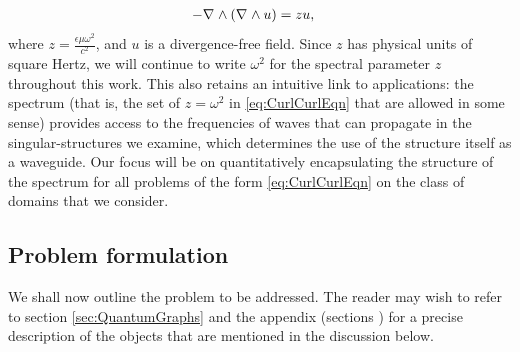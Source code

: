 \begin{align} \label{eq:CurlCurlEqn}
	- \nabla_{}\wedge\left(  \nabla_{}\wedge u  \right) &= zu,
\end{align}
where $z = \frac{\epsilon\mu\omega^2}{c^2}$, and $u$ is a divergence-free field.
Since $z$ has physical units of square Hertz, we will continue to write $\omega^2$ for the spectral parameter $z$ throughout this work.
This also retains an intuitive link to applications: the spectrum (that is, the set of $z=\omega^2$ in \eqref{eq:CurlCurlEqn} that are allowed in some sense) provides access to the frequencies of waves that can propagate in the singular-structures we examine, which determines the use of the structure itself as a waveguide.
Our focus will be on quantitatively encapsulating the structure of the spectrum for all problems of the form \eqref{eq:CurlCurlEqn} on the class of domains that we consider.

\subsection{Problem formulation} \label{ssec:OurSystem}
We shall now outline the problem to be addressed.
The reader may wish to refer to section \ref{sec:QuantumGraphs} and the appendix (sections ) for a precise description of the objects that are mentioned in the discussion below. 


